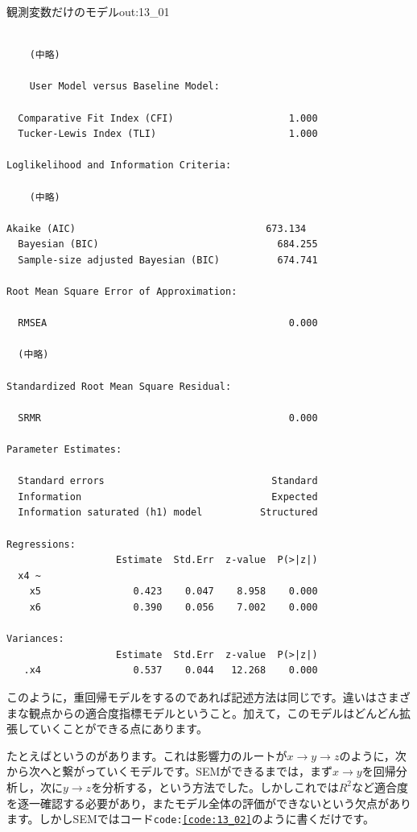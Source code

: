\documentclass{ltjsbook}
\begin{document}
\begin{Rscreen}{観測変数だけのモデル}{out:13_01}
	\begin{verbatim}

    (中略)

    User Model versus Baseline Model:

  Comparative Fit Index (CFI)                    1.000
  Tucker-Lewis Index (TLI)                       1.000

Loglikelihood and Information Criteria:

    (中略)

Akaike (AIC)                                 673.134
  Bayesian (BIC)                               684.255
  Sample-size adjusted Bayesian (BIC)          674.741

Root Mean Square Error of Approximation:

  RMSEA                                          0.000

  (中略)

Standardized Root Mean Square Residual:

  SRMR                                           0.000

Parameter Estimates:

  Standard errors                             Standard
  Information                                 Expected
  Information saturated (h1) model          Structured

Regressions:
                   Estimate  Std.Err  z-value  P(>|z|)
  x4 ~                                                
    x5                0.423    0.047    8.958    0.000
    x6                0.390    0.056    7.002    0.000

Variances:
                   Estimate  Std.Err  z-value  P(>|z|)
   .x4                0.537    0.044   12.268    0.000
\end{verbatim}
\end{Rscreen}

このように，重回帰モデルをするのであれば記述方法は同じです。違いはさまざまな観点からの適合度指標モデルということ。加えて，このモデルはどんどん拡張していくことができる点にあります。

たとえばというのがあります。これは影響力のルートが$x \to y \to z$のように，次から次へと繋がっていくモデルです。SEMができるまでは，まず$x \to y$を回帰分析し，次に$y \to z$を分析する，という方法でした。しかしこれでは$R^2$など適合度を逐一確認する必要があり，またモデル全体の評価ができないという欠点があります。しかしSEMではコード\texttt{code:\ref{code:13_02}}のように書くだけです。
\end{document}
